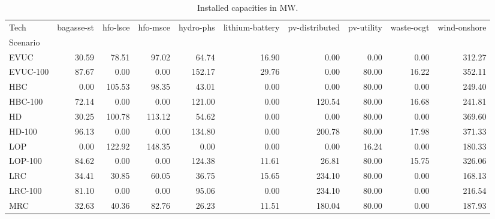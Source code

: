 \begin{table}
\centering
\caption{Installed capacities in MW.}
\label{tab:installed_capacities}
\begin{tabular}{lrrrrrrrrr}
\toprule
Tech &  bagasse-st &  hfo-lsce &  hfo-msce &  hydro-phs &  lithium-battery &  pv-distributed &  pv-utility &  waste-ocgt &  wind-onshore \\
Scenario &             &           &           &            &                  &                 &             &             &               \\
\midrule
EVUC     &       30.59 &     78.51 &     97.02 &      64.74 &            16.90 &            0.00 &        0.00 &        0.00 &        312.27 \\
EVUC-100 &       87.67 &      0.00 &      0.00 &     152.17 &            29.76 &            0.00 &       80.00 &       16.22 &        352.11 \\
HBC      &        0.00 &    105.53 &     98.35 &      43.01 &             0.00 &            0.00 &       80.00 &        0.00 &        249.40 \\
HBC-100  &       72.14 &      0.00 &      0.00 &     121.00 &             0.00 &          120.54 &       80.00 &       16.68 &        241.81 \\
HD       &       30.25 &    100.78 &    113.12 &      54.62 &             0.00 &            0.00 &       80.00 &        0.00 &        369.60 \\
HD-100   &       96.13 &      0.00 &      0.00 &     134.80 &             0.00 &          200.78 &       80.00 &       17.98 &        371.33 \\
LOP      &        0.00 &    122.92 &    148.35 &       0.00 &             0.00 &            0.00 &       16.24 &        0.00 &        180.33 \\
LOP-100  &       84.62 &      0.00 &      0.00 &     124.38 &            11.61 &           26.81 &       80.00 &       15.75 &        326.06 \\
LRC      &       34.41 &     30.85 &     60.05 &      36.75 &            15.65 &          234.10 &       80.00 &        0.00 &        168.13 \\
LRC-100  &       81.10 &      0.00 &      0.00 &      95.06 &             0.00 &          234.10 &       80.00 &        0.00 &        216.54 \\
MRC      &       32.63 &     40.36 &     82.76 &      26.23 &            11.51 &          180.04 &       80.00 &        0.00 &        187.93 \\

\end{tabular}
\end{table}
